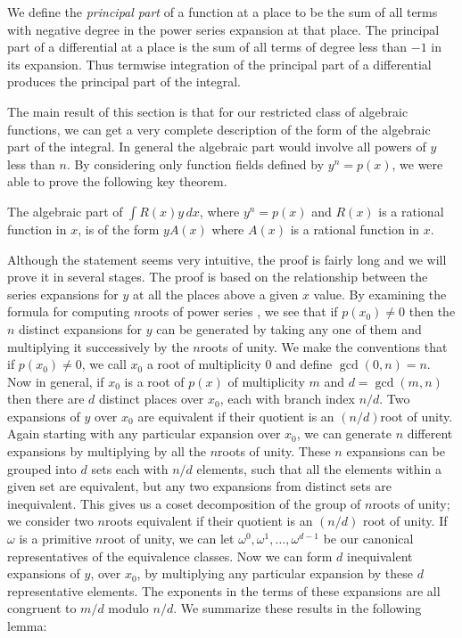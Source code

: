 We define the {\em principal part} of a function at a place to be
the sum of all terms with negative degree in the power series expansion
at that place.  The principal part of a differential  at a place
is the sum of
all terms of degree less than $-1$ in its expansion.  Thus termwise
integration of the principal part of a differential produces the
principal part of the integral.

The main result of this section is that for our restricted
class of algebraic functions, we can get a very complete description
of the form of the algebraic part of the integral.  In general the
algebraic part would involve all powers of $y$ less than $n$.  By considering
only function fields defined by $y^n=p(x)$, we were able to prove the
following key theorem.
	
\begin{theorem}
The algebraic part of $\int R(x)y\,dx$, where $y^n=p(x)$ and $R(x)$ is
a rational function in $x$, is of the form $yA(x)$ where $A(x)$ is a
rational function in $x$.
\end{theorem}

Although the statement seems very intuitive, the proof is
fairly long and we will prove it in several stages.  The proof is based
on the relationship between the series expansions for $y$ at
all the places above a given $x$ value.  By examining the formula for
computing $n$\th roots of power series \cite{Zippel76}, we
see that if 
$p(x_0) \not= 0$ then the $n$ distinct expansions for $y$ can be generated by
taking any one of them and multiplying it successively by the $n$\th roots
of unity. We make the conventions that if $p(x_0) \not= 0$, we call $x_0$ a root
of multiplicity $0$ and define $\gcd(0,n)=n$.
Now in general, if $x_0$ is a root of $p(x)$ of multiplicity $m$ and 
$d=\gcd(m,n)$ then there are $d$ distinct places over $x_0$, each with
branch index $n/d$. 
Two expansions of $y$ over $x_0$ are equivalent if their quotient is an
$(n/d)$\th root of unity.  Again starting with any particular expansion
over $x_0$, we can generate $n$ different expansions by multiplying by
all the $n$\th roots of unity.
These $n$ expansions can be grouped into $d$ sets each with $n/d$ elements,
such that all the elements within a given set are equivalent, but any
two expansions from distinct sets are inequivalent.  
This gives us a coset decomposition of the group of $n$\th roots of unity;
we consider two $n$\th roots equivalent if their quotient is an $(n/d)$\th
root of unity.  If $\omega$ is a primitive $n$\th root of unity, we can let
$\omega^0, \omega^1, \ldots, \omega^{d-1}$ be our canonical representatives of
the equivalence classes.  Now we can
form $d$ inequivalent expansions  of $y$, over $x_0$,
by multiplying any particular
expansion by these $d$ representative elements.
The exponents in the terms of these expansions are all
congruent to $m/d$ modulo $n/d$.  We summarize these results in the
following lemma:

